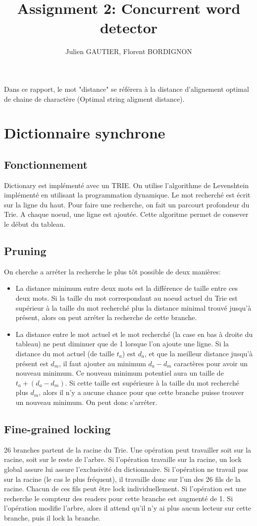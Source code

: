 \documentclass{article}
\title{Assignment 2: Concurrent word detector}
\author{Julien GAUTIER, Florent BORDIGNON}
\begin{document}
\maketitle
Dans ce rapport, le mot "distance" se référera à la distance
d'alignement optimal de chaine de charactère (Optimal string aligment
distance).

\section{Dictionnaire synchrone}
\subsection{Fonctionnement}
Dictionary est implémenté avec un TRIE.
On utilise l'algorithme de Levenshtein implémenté en utilisant la
programmation dynamique.
Le mot recherché est écrit sur la ligne du haut.
Pour faire une recherche, on fait un parcourt profondeur du Trie.  A
chaque noeud, une ligne est ajoutée.
Cette algoritme permet de consever le début du tableau.

\subsection{Pruning}
On cherche a arréter la recherche le plus tôt possible de deux manières:
\begin{itemize}
\item La distance minimum entre deux mots est la différence de taille
  entre ces deux mots.
Si la taille du mot correspondant au noeud actuel du Trie est supérieur
à la taille du mot recherché plus la distance minimal trouvé jusqu'à
présent, alors on peut arréter la recherche de cette branche.
\item La distance entre le mot actuel et le mot recherché (la case en
  bas à droite du tableau) ne peut diminuer que de 1 lorsque l'on ajoute
  une ligne.
Si la distance du mot actuel (de taille $t_a$) est $d_a$, et que la
meilleur distance jusqu'à présent est $d_m$, il faut ajouter au minimum
$d_a - d_m$ caractères pour avoir un nouveau minimum.
Ce nouveau minimum potentiel aura un taille de $t_a + (d_a - d_m)$.
Si cette taille est supérieure à la taille du mot recherché plus $d_m$,
alors il n'y a aucune chance pour que cette branche puisse trouver un
nouveau minimum.
On peut donc s'arréter.
\end{itemize}

\subsection{Fine-grained locking}
26 branches partent de la racine du Trie.
Une opération peut travailler soit sur la racine, soit sur le reste de
l'arbre.
Si l'opération travaille sur la racine, un lock global assure lui assure
l'exclusivité du dictionnaire.
Si l'opération ne travail pas sur la racine (le cas le plus fréquent),
il travaille donc sur l'un des 26 fils de la racine.
Chacun de ces fils peut être lock individuellement.
Si l'opération est une recherche le compteur des readers pour cette
branche est augmenté de 1.
Si l'opération modifie l'arbre, alors il attend qu'il n'y ai plus aucun
lecteur sur cette branche, puis il lock la branche.
\end{document}
